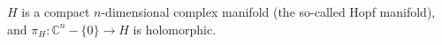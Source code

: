 $H$ is a compact $n$-dimensional complex manifold (the so-called Hopf manifold), and $\pi_H : \mathbb{C}^n - \{0\} \rightarrow H$ is holomorphic.
